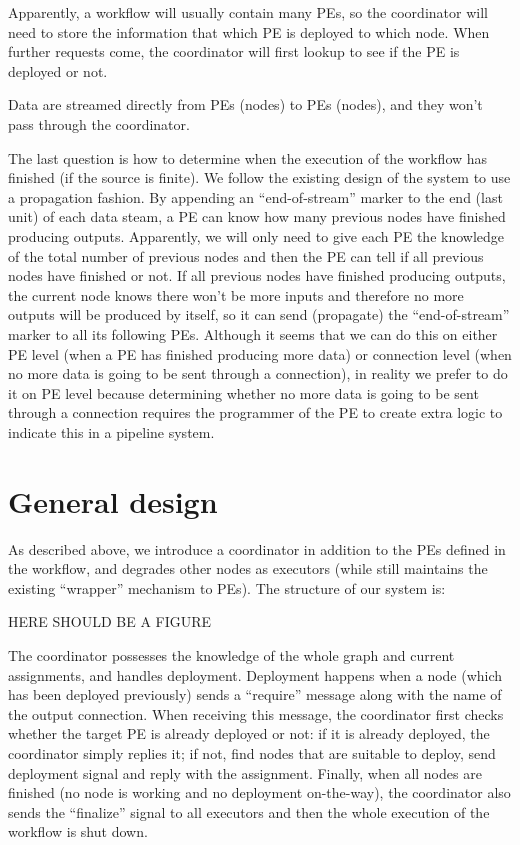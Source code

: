 Apparently, a workflow will usually contain many PEs, so the coordinator will need to store the information that which PE is deployed to which node. When further requests come, the coordinator will first lookup to see if the PE is deployed or not.

Data are streamed directly from PEs (nodes) to PEs (nodes), and they won't pass through the coordinator.

The last question is how to determine when the execution of the workflow has finished (if the source is finite). We follow the existing design of the system to use a propagation fashion. By appending an ``end-of-stream'' marker to the end (\ie last unit) of each data steam, a PE can know how many previous nodes have finished producing outputs. Apparently, we will only need to give each PE the knowledge of the total number of previous nodes and then the PE can tell if all previous nodes have finished or not. If all previous nodes have finished producing outputs, the current node knows there won't be more inputs and therefore no more outputs will be produced by itself, so it can send (propagate) the ``end-of-stream'' marker to all its following PEs. Although it seems that we can do this on either PE level (when a PE has finished producing more data) or connection level (when no more data is going to be sent through a connection), in reality we prefer to do it on PE level because determining whether no more data is going to be sent through a connection requires the programmer of the PE to create extra logic to indicate this in a pipeline system.

\section{General design}	
As described above, we introduce a coordinator in addition to the PEs defined in the workflow, and degrades other nodes as executors (while still maintains the existing ``wrapper'' mechanism to PEs). The structure of our system is:

HERE SHOULD BE A FIGURE

The coordinator possesses the knowledge of the whole graph and current assignments, and handles deployment. Deployment happens when a node (which has been deployed previously) sends a ``require'' message along with the name of the output connection. When receiving this message, the coordinator first checks whether the target PE is already deployed or not: if it is already deployed, the coordinator simply replies it; if not, find nodes that are suitable to deploy, send deployment signal and reply with the assignment. Finally, when all nodes are finished (\ie no node is working and no deployment on-the-way), the coordinator also sends the ``finalize'' signal to all executors and then the whole execution of the workflow is shut down.
 
